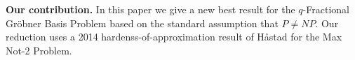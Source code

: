 \documentclass{article}
\begin{document}

 



\noindent \textbf{Our contribution.} 
In this paper we give a new best result for the $q$-Fractional Gr\"{o}bner Basis Problem based on the standard assumption that $P\neq NP$. Our reduction uses a 2014 hardenss-of-approximation result of H{\aa}stad for the Max Not-2 Problem.
\end{document}
